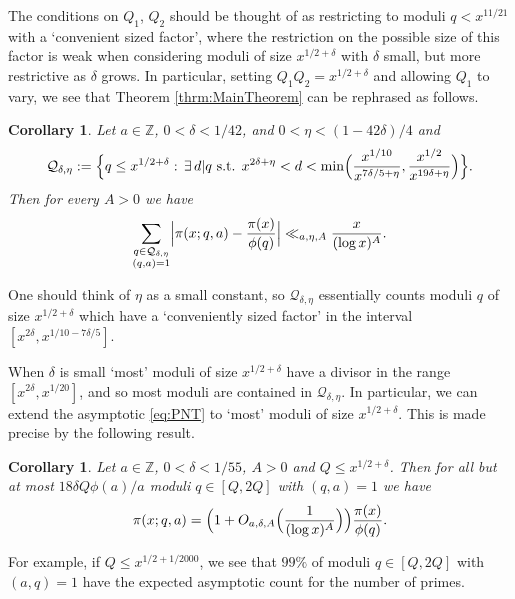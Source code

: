 \documentclass[10pt]{amsart}
\theoremstyle{plain}
\newtheorem{crllry}[thrm]{Corollary}
\numberwithin{equation}{section}
\begin{document}
The conditions on $Q_1$, $Q_2$ should be thought of as restricting to moduli $q<x^{11/21}$ with a `convenient sized factor', where the restriction on the possible size of this factor is weak when considering moduli of size $x^{1/2+\delta}$ with $\delta$ small, but more restrictive as $\delta$ grows. In particular, setting $Q_1Q_2=x^{1/2+\delta}$ and allowing $Q_1$ to vary, we see that Theorem \ref{thrm:MainTheorem} can be rephrased as follows.
%
%
%
%
%
%
%
%
\begin{crllry}\label{crllry:BVDivisor}
Let $a\in\mathbb{Z}$, $0<\delta<1/42$, and $0<\eta<(1-42\delta)/4$ and 
\[
\mathcal{Q}_{\delta,\eta}:=\Bigl\{q\le x^{1/2+\delta}:\, \exists\, d|q\text{ s.t. }x^{2\delta+\eta}<d<\min\Bigl(\frac{x^{1/10}}{x^{7\delta/5+\eta}},\frac{x^{1/2}}{x^{19\delta+\eta}}\Bigr)\Bigr\}.
\]
Then for every $A>0$ we have
\[
\sum_{\substack{q\in\mathcal{Q}_{\delta,\eta}\\ (q,a)=1}}\Bigl|\pi(x;q,a)-\frac{\pi(x)}{\phi(q)}\Bigr|\ll_{a,\eta,A}\frac{x}{(\log{x})^A}.
\]
\end{crllry}
%
%
%
%
%
%
%
%
One should think of $\eta$ as a small constant, so $\mathcal{Q}_{\delta,\eta}$ essentially counts moduli $q$ of size $x^{1/2+\delta}$ which have a `conveniently sized factor' in the interval $[x^{2\delta},x^{1/10-7\delta/5}]$.

When $\delta$ is small `most' moduli of size $x^{1/2+\delta}$ have a divisor in the range $[x^{2\delta},x^{1/20}]$, and so most moduli are contained in $\mathcal{Q}_{\delta,\eta}$. In particular, we can extend the asymptotic \eqref{eq:PNT} to `most' moduli of size $x^{1/2+\delta}$. This is made precise by the following result.
%
%
%
%
%
%
%
%
\begin{crllry}\label{crllry:MostModuli}
Let $a\in\mathbb{Z}$, $0<\delta<1/55$, $A>0$ and $Q\le x^{1/2+\delta}$. Then for all but at most $18\delta Q\phi(a)/a$ moduli $q\in [Q,2Q]$ with $(q,a)=1$ we have
\[
\pi(x;q,a)=\Bigl(1+O_{a,\delta,A}\Bigl(\frac{1}{(\log{x})^A}\Bigr)\Bigr)\frac{\pi(x)}{\phi(q)}.
\]
\end{crllry}
%
%
%
%
%
%
%
%
For example, if $Q\le x^{1/2+1/2000}$, we see that $99\%$ of moduli $q\in[Q,2Q]$ with $(a,q)=1$ have the expected asymptotic count for the number of primes.
\end{document}
